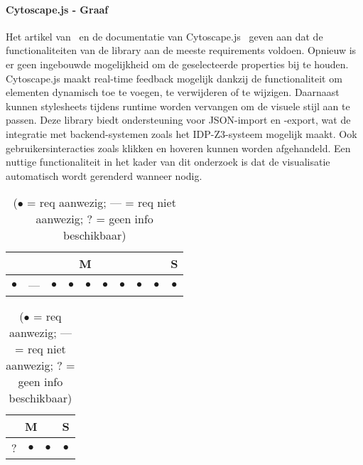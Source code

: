 \paragraph{Cytoscape.js - Graaf}
Het artikel van~\textcite{Franz2015} en de documentatie van Cytoscape.js~\textcite{Franz2025} geven aan dat de functionaliteiten van de library aan de meeste requirements voldoen. Opnieuw is er geen ingebouwde mogelijkheid om de geselecteerde properties bij te houden. Cytoscape.js maakt real-time feedback mogelijk dankzij de functionaliteit om elementen dynamisch toe te voegen, te verwijderen of te wijzigen. Daarnaast kunnen stylesheets tijdens runtime worden vervangen om de visuele stijl aan te passen. Deze library biedt ondersteuning voor JSON-import en -export, wat de integratie met backend-systemen zoals het IDP-Z3-syst\-eem mogelijk maakt. Ook gebruikersinteracties zoals klikken en hoveren kunnen worden afgehandeld. Een nuttige functionaliteit in het kader van dit onderzoek is dat de visualisatie automatisch wordt gerenderd wanneer nodig.

\begin{table}[htbp]
    \centering
    \begin{minipage}{0.48\textwidth}
        \centering
        \begin{tabular}{|ccccccccc|c|}
            \hline
            \multicolumn{9}{|c|}{M} & \multicolumn{1}{c|}{S} \\
            \midrule
            $\bullet$ & --- & $\bullet$ & $\bullet$ & $\bullet$ & $\bullet$ & $\bullet$ & $\bullet$ & $\bullet$ & $\bullet$ \\
            \bottomrule
        \end{tabular}
        \caption{Cytoscape.js - Functionele requirements}
    \end{minipage}
    \hfill
    \begin{minipage}{0.48\textwidth}
        \centering
        \begin{tabular}{|ccc|c|}
            \hline
            \multicolumn{3}{|c|}{M} & \multicolumn{1}{c|}{S} \\
            \midrule
            ? & $\bullet$ & $\bullet$ & $\bullet$ \\
            \bottomrule
        \end{tabular}
        \caption{Cytoscape.js - Niet-functionele requirements}
    \end{minipage}
    \caption*{($\bullet$ = req aanwezig; --- = req niet aanwezig; ? = geen info beschikbaar)}
\end{table}

